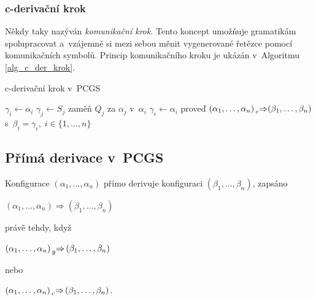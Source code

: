 \subsubsection*{c-derivační krok}\label{kap_c_der_krok}
Někdy taky nazýván \emph{komunikační krok}. Tento koncept umožňuje gramatikám spolupracovat a~vzájemně si mezi sebou měnit vygenerované řetězce pomocí komunikačních symbolů.
Princip komunikačního kroku je ukázán v~Algoritmu \ref{alg_c_der_krok}.
\begin{algorithm}[h]
    \caption{c-derivační krok v~PCGS}
    \label{alg_c_der_krok}
    \begin{algorithmic}[1]
        \NewLine

            \State $\gamma_i \gets \alpha_i$
        \EndFor 
                    \State $\gamma_j \gets S_j$
                    \State zaměň $Q_j$ za $\alpha_j$ v~$\alpha_i$
                    \State $\gamma_i \gets \alpha_i$ 
                \EndFor
            \EndIf
        \EndFor
        \State proveď $(\alpha_1, \ldots, \alpha_n) \prescript{}{c}{\Rightarrow} (\beta_1, \ldots, \beta_n)$ s~$\beta_i = \gamma_i,\;i \in \{1, \ldots, n\}$ 
    \end{algorithmic}
\end{algorithm}

\subsection*{Přímá derivace v~PCGS}
\begin{definition}
    Konfigurace $(\alpha_1, \ldots, \alpha_n)$ přímo derivuje konfiguraci $(\beta_1, \ldots, \beta_n)$, zapsáno
    \begin{center}
        $(\alpha_1, \ldots, \alpha_n) \Rightarrow (\beta_1, \ldots, \beta_n)$
    \end{center} 
    právě tehdy, když
    \begin{center}
        $(\alpha_1, \ldots, \alpha_n) \prescript{}{g}{\Rightarrow}\, (\beta_1, \ldots, \beta_n)$
    \end{center}
    nebo
    \begin{center}
        $(\alpha_1, \ldots, \alpha_n) \prescript{}{c}{\Rightarrow}\, (\beta_1, \ldots, \beta_n)$.
    \end{center}
\end{definition}

